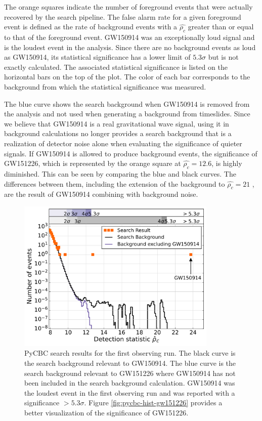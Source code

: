 The orange squares indicate the 
number of foreground events that were actually recovered by the search 
pipeline. The false alarm rate for a given foreground 
event is defined as the rate of background events with a $\hat{\rho_c}$ 
greater than or equal to that of the foreground event. GW150914 
was an exceptionally loud signal and is the loudest event in the 
analysis. Since there are no background events as loud as GW150914, 
its statistical significance has a lower limit of $5.3\sigma$ 
but is not exactly calculated. The associated statistical significance 
is listed on the horizontal bars on the top of the plot. The color 
of each bar corresponds to the background from which the statistical 
significance was measured.  

The blue curve shows the search background when GW150914 is removed 
from the analysis and not used when generating a background from 
timeslides. Since we believe that GW150914 is a real gravitational wave 
signal, using it in background calculations no longer provides a 
search background that is a realization of detector noise alone 
when evaluating the significance of quieter signals. 
If GW150914 is allowed to produce background events, the 
significance of GW151226, which is represented by the orange square at 
$\hat{\rho_c} = 12.6$, is highly diminished. This can be seen by comparing 
the blue and black curves. The differences between them, including the 
extension of the background to $\hat{\rho_c} = 21$ , are the result 
of GW150914 combining with background noise.

\begin{figure}[ht!]%
\includegraphics[width=0.85\textwidth]{figures/O1/pycbc_hist_GW150914}
\caption[PyCBC result histograms for GW150914]{PyCBC search results for %
         the first observing run. The black curve is the search background %
         relevant to GW150914. The blue curve is the search background %
         relevant to GW151226 where GW150914 has not been included in the %
         search background calculation. GW150914 was the loudest event in %
         the first observing run and was reported with a significance %
         $> 5.3\sigma$. Figure \ref{fig:pycbc-hist-gw151226} provides %
         a better visualization of the significance of GW151226.}
\label{fig:pycbc-hist-gw150914}
\end{figure}

